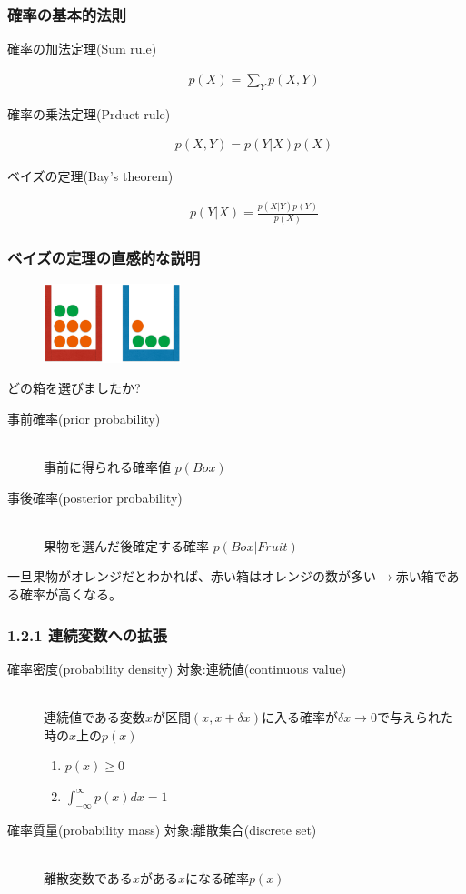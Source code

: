 \documentclass[dvipdfmx]{beamer}
\theoremstyle{definition}
\begin{document}
\begin{frame}
  \frametitle{確率の基本的法則}
  \begin{description}
    \item[確率の加法定理(Sum rule)]
      \begin{gather*}
        p(X)=\sum_{Y} p(X,Y)
      \end{gather*}
    \item[確率の乗法定理(Prduct rule)]
      \begin{gather*}
        p(X,Y)=p(Y|X)p(X)
      \end{gather*}
    \item[ベイズの定理(Bay's theorem)]
      \begin{gather*}
        p(Y|X) = \frac{p(X|Y)p(Y)}{p(X)}
      \end{gather*}
  \end{description}
\end{frame}
\begin{frame}
  \frametitle{ベイズの定理の直感的な説明}
  \begin{figure}[htb]
    \centering
    \includegraphics[width=4.0cm,clip]{res/probability.eps}
  \end{figure}
  どの箱を選びましたか?
  \begin{description}
    \item[事前確率(prior probability)] \hfill \\
      事前に得られる確率値 $p(Box)$
    \item[事後確率(posterior probability)] \hfill \\
      果物を選んだ後確定する確率 $p(Box|Fruit)$
  \end{description}
  一旦果物がオレンジだとわかれば、赤い箱はオレンジの数が多い$\to$赤い箱である確率が高くなる。
\end{frame}

\begin{frame}
  \frametitle{1.2.1 連続変数への拡張}
  \begin{description}
    \item[確率密度(probability density) 対象:連続値(continuous value)] \hfill \\
      連続値である変数$x$が区間$(x,x + \delta x)$に入る確率が$\delta x \to 0$で与えられた時の$x$上の$p(x)$
      \\
      \begin{enumerate}
        \item $p(x) \geq 0$
        \item $\int_{-\infty}^{\infty} p(x) dx = 1$
      \end{enumerate}
    \item[確率質量(probability mass) 対象:離散集合(discrete set)] \hfill \\
      離散変数である$x$がある$x$になる確率$p(x)$
    \end{description}
\end{frame}
\end{document}
